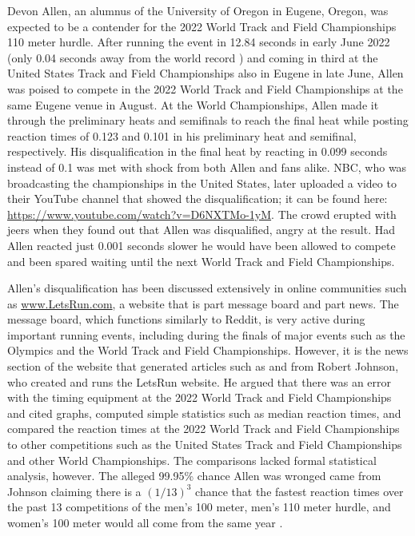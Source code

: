 \documentclass[12pt, letterpaper, titlepage]{article}
\begin{document}
Devon Allen, an alumnus of the University of Oregon in 
Eugene, Oregon, was
expected to be a contender for the 2022 World Track and Field Championships 110 
meter hurdle.  After running the event in 12.84 seconds in early June 2022 
(only 0.04 seconds away from the world record \citep{wa2022preview}) and coming 
in third at the United States Track and Field 
Championships also in Eugene in late June, Allen was poised to compete in the 
2022 World Track and Field Championships at the same Eugene venue in August.
At the World Championships, Allen made it through the preliminary
heats and semifinals to reach the final heat while posting reaction times of 
0.123 and 0.101 in his preliminary heat and semifinal, respectively.  
His disqualification in the final heat by reacting in 0.099 seconds instead of 
0.1 was met
with shock from both Allen and fans alike.  NBC, who was broadcasting the
championships in the United States, later uploaded a video to their YouTube
channel that showed the disqualification; it can be found here:
\url{https://www.youtube.com/watch?v=D6NXTMo-1yM}. The crowd erupted with jeers 
when they found out that Allen was disqualified, angry at the result.  Had Allen 
reacted just 0.001 seconds slower he would have been allowed to compete and been 
spared waiting until the next World Track and Field Championships.

Allen's disqualification has been discussed extensively in online communities
such as \url{www.LetsRun.com}, a website that is part message board and part
news. The message board,
which functions similarly to Reddit, is very active during important running
events, including during the finals of major events such as
the Olympics and the World Track and Field Championships.  However, it is the
news section of the website that generated articles such as \citet{johnson2022data}
and \citet{johnson2022was} from  Robert Johnson, who created and runs 
the LetsRun website.  He argued that there was an error
with the timing equipment at the 2022 World Track and Field Championships and
cited graphs, computed simple statistics such as median reaction times, and 
compared the reaction times at the 2022 World Track and Field Championships to 
other competitions
such as the United States Track and Field Championships and other World Championships.
The comparisons lacked formal statistical analysis, however. 
The alleged 99.95\% chance Allen was wronged 
came from Johnson claiming there is a $(1/13)^3$ chance that the fastest 
reaction times over the past 13 competitions of the men's 100 meter, men's 110 
meter hurdle, and women's 100 meter would all come from the same year 
\citep{johnson2022was}.
\end{document}
